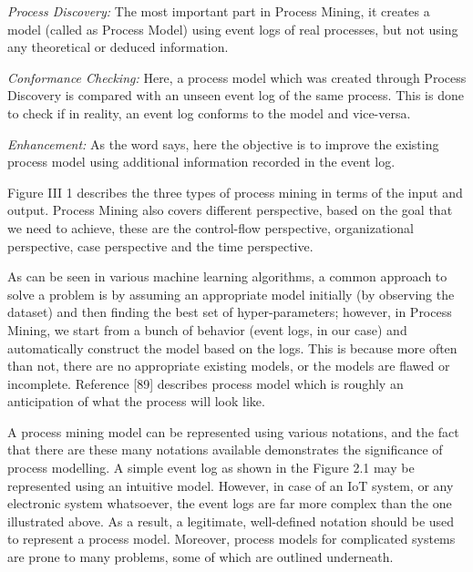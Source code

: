 \textit{Process Discovery:} The most important part in Process Mining, it creates a model (called as Process Model) using event logs of real processes, but not using any theoretical or deduced information. 

\textit{Conformance Checking:} Here, a process model which was created through Process Discovery is compared with an unseen event log of the same process. This is done to check if in reality, an event log conforms to the model and vice-versa.

\textit{Enhancement:} As the word says, here the objective is to improve the existing process model using additional information recorded in the event log.

Figure III 1 describes the three types of process mining in terms of the input and output. Process Mining also covers different perspective, based on the goal that we need to achieve, these are the control-flow perspective, organizational perspective, case perspective and the time perspective. 

As can be seen in various machine learning algorithms, a common approach to solve a problem is by assuming an appropriate model initially (by observing the dataset) and then finding the best set of hyper-parameters; however, in Process Mining, we start from a bunch of behavior (event logs, in our case) and automatically construct the model based on the logs. This is because more often than not, there are no appropriate existing models, or the models are flawed or incomplete. Reference [89] describes process model which is roughly an anticipation of what the process will look like. 

A process mining model can be represented using various notations, and the fact that there are these many notations available demonstrates the significance of process modelling. A simple event log as shown in the Figure 2.1 may be represented using an intuitive model. However, in case of an IoT system, or any electronic system whatsoever, the event logs are far more complex than the one illustrated above. As a result, a legitimate, well-defined notation should be used to represent a process model. Moreover, process models for complicated systems are prone to many problems, some of which are outlined underneath.

